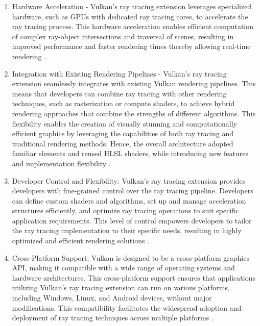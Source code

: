\documentclass[conference]{IEEEtran}
\begin{document}
\begin{enumerate}
    \item Hardware Acceleration - Vulkan's ray tracing extension leverages specialized hardware, such as GPUs with dedicated ray tracing cores, to accelerate the ray tracing process. This hardware acceleration enables efficient computation of complex ray-object intersections and traversal of scenes, resulting in improved performance and faster rendering times thereby allowing real-time rendering \cite{KHR_Vulkan_Ray_Tracing}.
    \item Integration with Existing Rendering Pipelines - Vulkan's ray tracing extension seamlessly integrates with existing Vulkan rendering pipelines. This means that developers can combine ray tracing with other rendering techniques, such as rasterization or compute shaders, to achieve hybrid rendering approaches that combine the strengths of different algorithms. This flexibility enables the creation of visually stunning and computationally efficient graphics by leveraging the capabilities of both ray tracing and traditional rendering methods. Hence, the overall architecture adopted familiar elements and reused HLSL shaders, while introducing new features and implementation flexibility \cite{KHR_Vulkan_Ray_Tracing}.
    \item Developer Control and Flexibility: Vulkan's ray tracing extension provides developers with fine-grained control over the ray tracing pipeline. Developers can define custom shaders and algorithms, set up and manage acceleration structures efficiently, and optimize ray tracing operations to suit specific application requirements. This level of control empowers developers to tailor the ray tracing implementation to their specific needs, resulting in highly optimized and efficient rendering solutions \cite{KHR_Vulkan_Ray_Tracing}. 
    \item Cross-Platform Support: Vulkan is designed to be a cross-platform graphics API, making it compatible with a wide range of operating systems and hardware architectures. This cross-platform support ensures that applications utilizing Vulkan's ray tracing extension can run on various platforms, including Windows, Linux, and Android devices, without major modifications. This compatibility facilitates the widespread adoption and deployment of ray tracing techniques across multiple platforms \cite{KHR_Vulkan_Ray_Tracing}.
\end{enumerate}
\end{document}
